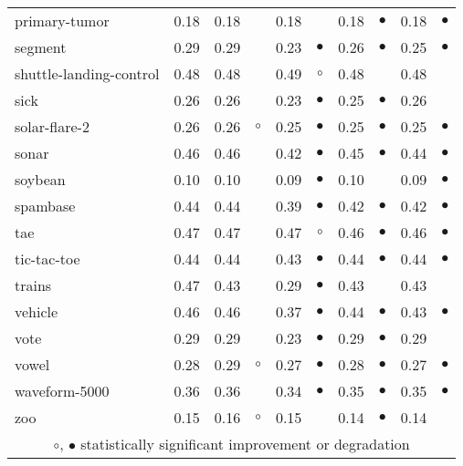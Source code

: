 \begin{table}[thb]
{\begin{tabular}{lrr@{\hspace{0.1cm}}cr@{\hspace{0.1cm}}cr@{\hspace{0.1cm}}cr@{\hspace{0.1cm}}c}
primary-tumor & 0.18 & 0.18 &           & 0.18 &           & 0.18 & $\bullet$ & 0.18 & $\bullet$\\
segment & 0.29 & 0.29 &           & 0.23 & $\bullet$ & 0.26 & $\bullet$ & 0.25 & $\bullet$\\
shuttle-landing-control & 0.48 & 0.48 &           & 0.49 &   $\circ$ & 0.48 &           & 0.48 &          \\
sick & 0.26 & 0.26 &           & 0.23 & $\bullet$ & 0.25 & $\bullet$ & 0.26 &          \\
solar-flare-2 & 0.26 & 0.26 &   $\circ$ & 0.25 & $\bullet$ & 0.25 & $\bullet$ & 0.25 & $\bullet$\\
sonar & 0.46 & 0.46 &           & 0.42 & $\bullet$ & 0.45 & $\bullet$ & 0.44 & $\bullet$\\
soybean & 0.10 & 0.10 &           & 0.09 & $\bullet$ & 0.10 &           & 0.09 & $\bullet$\\
spambase & 0.44 & 0.44 &           & 0.39 & $\bullet$ & 0.42 & $\bullet$ & 0.42 & $\bullet$\\
tae & 0.47 & 0.47 &           & 0.47 &   $\circ$ & 0.46 & $\bullet$ & 0.46 & $\bullet$\\
tic-tac-toe & 0.44 & 0.44 &           & 0.43 & $\bullet$ & 0.44 & $\bullet$ & 0.44 & $\bullet$\\
trains & 0.47 & 0.43 &           & 0.29 & $\bullet$ & 0.43 &           & 0.43 &          \\
vehicle & 0.46 & 0.46 &           & 0.37 & $\bullet$ & 0.44 & $\bullet$ & 0.43 & $\bullet$\\
vote & 0.29 & 0.29 &           & 0.23 & $\bullet$ & 0.29 & $\bullet$ & 0.29 &          \\
vowel & 0.28 & 0.29 &   $\circ$ & 0.27 & $\bullet$ & 0.28 & $\bullet$ & 0.27 & $\bullet$\\
waveform-5000 & 0.36 & 0.36 &           & 0.34 & $\bullet$ & 0.35 & $\bullet$ & 0.35 & $\bullet$\\
zoo & 0.15 & 0.16 &   $\circ$ & 0.15 &           & 0.14 & $\bullet$ & 0.14 &          \\
\hline
\multicolumn{10}{c}{$\circ$, $\bullet$ statistically significant improvement or degradation}\\
\end{tabular} \footnotesize \par}
\end{table}